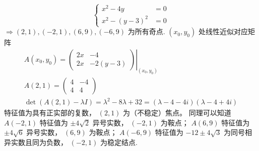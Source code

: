 \begin{solution}
    $$
        \left\{\begin{aligned}
            x^2-4 y     & =0 \\
            x^2-(y-3)^2 & =0
        \end{aligned}\right.
    $$
    $\Rightarrow(2,1),(-2,1),(6,9),(-6,9)$ 为所有奇点.
    $\left(x_0, y_0\right)$ 处线性近似对应矩阵
    $$
        \begin{gathered}
            A\left(x_0, y_0\right)=\left.\left(\begin{array}{ll}
                    2 x & -4      \\
                    2 x & -2(y-3)
                \end{array}\right)\right|_{\left(x_0, y_0\right)} \\
            A(2,1)=\left(\begin{array}{ll}
                    4 & -4 \\
                    4 & 4
                \end{array}\right) \\
            \operatorname{det}(A(2,1)-\lambda I)=\lambda^2-8 \lambda+32=(\lambda-4-4 i)(\lambda-4+4 i)
        \end{gathered}
    $$
    特征值为具有正实部的复数， $(2,1)$ 为（不稳定）焦点。
    同理可以知道 $A(-2,1)$ 特征值为 $\pm 4 \sqrt{2}$ 异号实数， $(-2,1)$ 为鞍点； $A(6,9)$ 特征值为 $\pm 4 \sqrt{6}$ 异号实数， $(6,9)$ 为鞍点； $A(-6,9)$ 特征值为 $-12 \pm 4 \sqrt{3}$ 为同号相异实数且同为负数， $(-2,1)$ 为稳定结点.
\end{solution}

